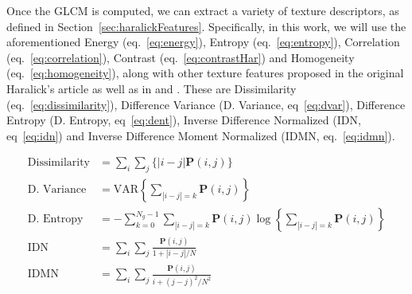 Once the \ac{GLCM} is computed, we can extract a variety of texture descriptors, as defined in Section~\ref{sec:haralickFeatures}. Specifically, in this work, we will use the aforementioned Energy (eq.~\ref{eq:energy}), Entropy (eq.~\ref{eq:entropy}), Correlation (eq.~\ref{eq:correlation}), Contrast (eq.~\ref{eq:contrastHar}) and Homogeneity (eq.~\ref{eq:homogeneity}), along with other texture features proposed in the original Haralick's article \cite{Haralick73} as well as in \cite{soh1999texture} and \cite{clausi2002analysis}. These are Dissimilarity\cite{soh1999texture} (eq.~\ref{eq:dissimilarity}), Difference Variance\cite{Haralick73} (D. Variance, eq~\ref{eq:dvar}), Difference Entropy\cite{Haralick73} (D. Entropy, eq~\ref{eq:dent}), Inverse Difference Normalized\cite{clausi2002analysis} (IDN, eq~\ref{eq:idn}) and Inverse Difference Moment Normalized\cite{clausi2002analysis} (IDMN, eq.~\ref{eq:idmn}). 

\begin{align}\label{eq:dissimilarity}
\text{Dissimilarity} & = \sum_i\sum_j\{|i-j|\mathbf{P}(i,j)\}\\\label{eq:dvar}
\text{D. Variance} &=  \text{VAR}\left\lbrace\sum_{|i-j|=k}\mathbf{P}(i,j)\right\rbrace\\\label{eq:dent}
\text{D. Entropy} &= -\sum\limits_{k=0}^{N_g-1} \sum_{|i-j|=k}\mathbf{P}(i,j) \log \left\lbrace \sum_{|i-j|=k}\mathbf{P}(i,j)\right\rbrace \\\label{eq:idn}
\text{IDN} &= \sum_i\sum_j \frac{\mathbf{P}(i,j)}{1+|i-j|/N}\\ \label{eq:idmn}
\text{IDMN} &= \sum_i\sum_j \frac{\mathbf{P}(i,j)}{i+(j-j)^2/N^2}
\end{align}

